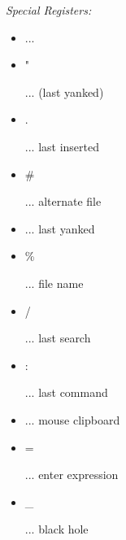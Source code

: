 \textit{Special Registers:}\\
\begin{itemize}
    \item \begin{code}\textquotedbl@\end{code} ... 
    \item \begin{code}\textquotedbl"\end{code} ...  (last yanked)
    \item \begin{code}\textquotedbl.\end{code} ... last inserted
    \item \begin{code}\textquotedbl\#\end{code} ... alternate file
    \item \begin{code}\end{code} ... last yanked
    \item \begin{code}\textquotedbl\%\end{code} ... file name
    \item \begin{code}\textquotedbl/\end{code} ... last search
    \item \begin{code}\textquotedbl:\end{code} ... last command
    \item \begin{code}\textquotedbl*\end{code} ... mouse clipboard
    \item \begin{code}\textquotedbl=\end{code} ... enter expression
    \item \begin{code}\textquotedbl\_\end{code} ... black hole
\end{itemize}
\ \\
